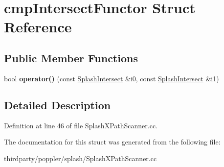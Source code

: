 \hypertarget{structcmp_intersect_functor}{}\section{cmp\+Intersect\+Functor Struct Reference}
\label{structcmp_intersect_functor}
\subsection*{Public Member Functions}
\begin{DoxyCompactItemize}
\item 
\mbox{\label{structcmp_intersect_functor_aeb656c2672d1d8e4714a2e949f6227b2}} 
bool {\bfseries operator()} (const \hyperlink{struct_splash_intersect}{Splash\+Intersect} \&i0, const \hyperlink{struct_splash_intersect}{Splash\+Intersect} \&i1)
\end{DoxyCompactItemize}


\subsection{Detailed Description}


Definition at line 46 of file Splash\+X\+Path\+Scanner.\+cc.



The documentation for this struct was generated from the following file\+:\begin{DoxyCompactItemize}
\item 
thirdparty/poppler/splash/Splash\+X\+Path\+Scanner.\+cc\end{DoxyCompactItemize}
